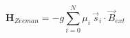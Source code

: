 \documentclass[preview]{standalone}
\begin{document}
\begin{varwidth}{50in}
  \begin{equation}
    \bm{H}_{Zeeman} = -g \sum_{i=0}^{N}\mu_{i}\, 
    \vec{s}_{i} \cdot\vec{B}_{ext} \nonumber
  \end{equation}
\end{varwidth}
\end{document}
